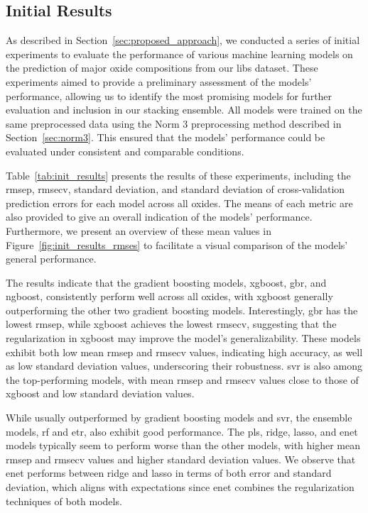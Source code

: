 \subsection{Initial Results}
As described in Section~\ref{sec:proposed_approach}, we conducted a series of initial experiments to evaluate the performance of various machine learning models on the prediction of major oxide compositions from our \gls{libs} dataset.
These experiments aimed to provide a preliminary assessment of the models' performance, allowing us to identify the most promising models for further evaluation and inclusion in our stacking ensemble.
All models were trained on the same preprocessed data using the Norm 3 preprocessing method described in Section~\ref{sec:norm3}.
This ensured that the models' performance could be evaluated under consistent and comparable conditions.

Table~\ref{tab:init_results} presents the results of these experiments, including the \gls{rmsep}, \gls{rmsecv}, standard deviation, and standard deviation of cross-validation prediction errors for each model across all oxides.
The means of each metric are also provided to give an overall indication of the models' performance.
Furthermore, we present an overview of these mean values in Figure~\ref{fig:init_results_rmses} to facilitate a visual comparison of the models' general performance.

The results indicate that the gradient boosting models, \gls{xgboost}, \gls{gbr}, and \gls{ngboost}, consistently perform well across all oxides, with \gls{xgboost} generally outperforming the other two gradient boosting models.
Interestingly, \gls{gbr} has the lowest \gls{rmsep}, while \gls{xgboost} achieves the lowest \gls{rmsecv}, suggesting that the regularization in \gls{xgboost} may improve the model's generalizability.
These models exhibit both low mean \gls{rmsep} and \gls{rmsecv} values, indicating high accuracy, as well as low standard deviation values, underscoring their robustness.
\gls{svr} is also among the top-performing models, with mean \gls{rmsep} and \gls{rmsecv} values close to those of \gls{xgboost} and low standard deviation values.

While usually outperformed by gradient boosting models and \gls{svr}, the ensemble models, \gls{rf} and \gls{etr}, also exhibit good performance.
The \gls{pls}, ridge, \gls{lasso}, and \gls{enet} models typically seem to perform worse than the other models, with higher mean \gls{rmsep} and \gls{rmsecv} values and higher standard deviation values.
We observe that \gls{enet} performs between ridge and \gls{lasso} in terms of both error and standard deviation, which aligns with expectations since \gls{enet} combines the regularization techniques of both models.

